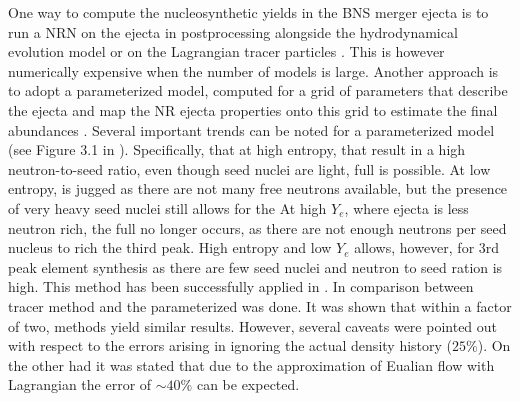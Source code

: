 One way to compute the nucleosynthetic yields in the \ac{BNS} merger ejecta is to run a \ac{NRN} 
on the ejecta in postprocessing alongside the hydrodynamical evolution model or 
on the Lagrangian tracer particles 
\citep[\eg]{Goriely:2011vg,Korobkin:2012uy,Grossman:2013lqa,Wanajo:2014wha,Just:2014fka,Martin:2015hxa}.
This is however numerically expensive when the number of models is large. 
%
Another approach is to adopt a parameterized \nuc{} model, computed for a grid of parameters 
that describe the ejecta and map the \ac{NR} ejecta properties onto this grid to estimate the 
final abundances \citep{Lippuner:2015gwa}. 
%
Several important trends can be noted for a parameterized model 
(see Figure 3.1 in \citet{Lippuner:2018phd}).
Specifically, that at high entropy, that result in a high neutron-to-seed ratio, 
even though seed nuclei are light, full \rproc{} is possible.
At low entropy, \rproc{} is jugged as there are not many free neutrons available,
but the presence of very heavy seed nuclei still allows for the \rproc{}
At high $Y_e$, where ejecta is less neutron rich, the full \rproc{} no longer occurs,  
as there are not enough neutrons per seed nucleus to rich the third peak.
High entropy and low $Y_e$ allows, however, for $3$rd peak element synthesis as there are 
few seed nuclei and neutron to seed ration is high.
%
This method has been successfully applied in \citet{Radice:2016dwd,Radice:2018pdn}.
In \citet{Radice:2018pdn} comparison between tracer method and the parameterized was done.
It was shown that within a factor of two, methods yield similar results. However, several 
caveats were pointed out with respect to the errors arising in ignoring the actual density 
history ($25\%$). On the other had it was stated that due to the approximation of 
Eualian flow with Lagrangian the error of $\sim 40\%$ can be expected.


